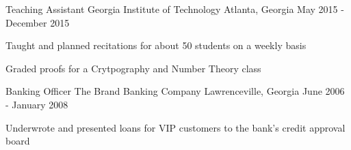 \begin{cventries}
  \cventry
    {Teaching Assistant} %
    {Georgia Institute of Technology} %
    {Atlanta, Georgia} %
    {May 2015 - December 2015} %
    {
      \begin{cvitems} %
        \item {Taught and planned recitations for about 50 students on a weekly basis}
        \item{Graded proofs for a Crytpography and Number Theory class}
      \end{cvitems}
    }

  \cventry
    {Banking Officer} %
    {The Brand Banking Company} %
    {Lawrenceville, Georgia} %
    {June 2006 - January 2008} %
    {\begin{cvitems} %
      \item {Underwrote and presented loans for VIP customers to the bank's credit approval board}
    \end{cvitems}}

\end{cventries}
